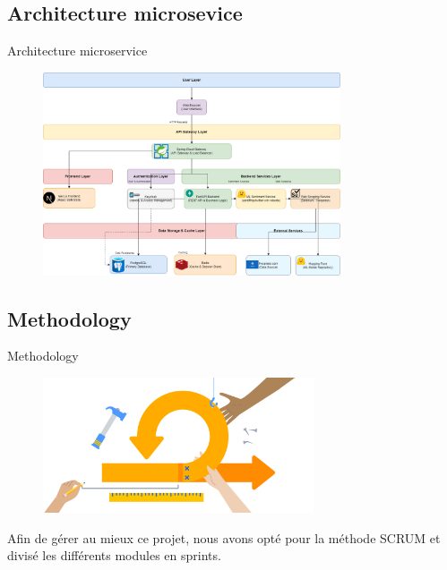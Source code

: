 \subsection{Architecture microsevice}

\begin{frame}{Architecture microservice}
    \begin{figure}[H]
        \centering
        \includegraphics[height=6cm]{assets/images/arch.png}
    \end{figure}
\end{frame}




\subsection{Methodology}
\begin{frame}{Methodology}

    \begin{figure}[H]
        \centering
        \includegraphics[height=4cm]{assets/images/scrum.png}
    \end{figure}

    Afin de gérer au mieux ce projet, nous avons opté pour la méthode SCRUM et divisé les différents modules en sprints.
\end{frame}


